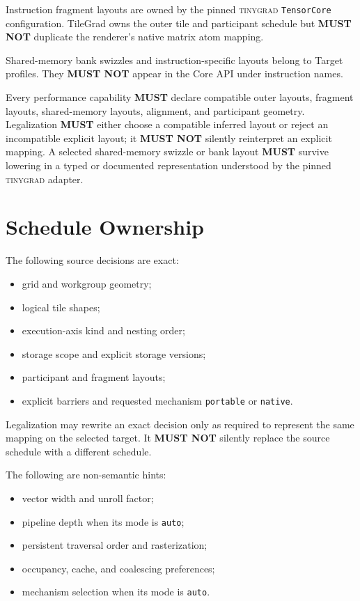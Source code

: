 \documentclass[10pt,letterpaper]{article}
\newcommand{\tinygrad}{\textsc{tinygrad}}
\newcommand{\must}{\textbf{MUST}}
\newcommand{\mustnot}{\textbf{MUST NOT}}
\begin{document}
Instruction fragment layouts are owned by the pinned \tinygrad{}
\texttt{TensorCore} configuration. TileGrad owns the outer tile and participant
schedule but \mustnot{} duplicate the renderer's native matrix atom mapping.

Shared-memory bank swizzles and instruction-specific layouts belong to Target
profiles. They \mustnot{} appear in the Core API under instruction names.

Every performance capability \must{} declare compatible outer layouts,
fragment layouts, shared-memory layouts, alignment, and participant geometry.
Legalization \must{} either choose a compatible inferred layout or reject an
incompatible explicit layout; it \mustnot{} silently reinterpret an explicit
mapping. A selected shared-memory swizzle or bank layout \must{} survive
lowering in a typed or documented representation understood by the pinned
\tinygrad{} adapter.

\section*{Schedule Ownership}

The following source decisions are exact:

\begin{itemize}
  \item grid and workgroup geometry;
  \item logical tile shapes;
  \item execution-axis kind and nesting order;
  \item storage scope and explicit storage versions;
  \item participant and fragment layouts;
  \item explicit barriers and requested mechanism
        \texttt{portable} or \texttt{native}.
\end{itemize}

Legalization may rewrite an exact decision only as required to represent the
same mapping on the selected target. It \mustnot{} silently replace the source
schedule with a different schedule.

The following are non-semantic hints:

\begin{itemize}
  \item vector width and unroll factor;
  \item pipeline depth when its mode is \texttt{auto};
  \item persistent traversal order and rasterization;
  \item occupancy, cache, and coalescing preferences;
  \item mechanism selection when its mode is \texttt{auto}.
\end{itemize}
\end{document}
